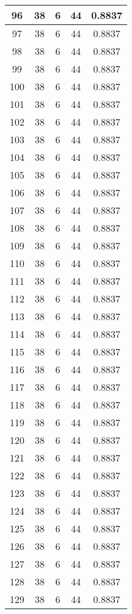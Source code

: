 \documentclass[letterpaper, 12pt]{article}
\begin{document}
\begin{longtable}{|c|c|c|c|c|}
\hline
96 & 38 & 6 & 44 & 0.8837 \\
\hline
97 & 38 & 6 & 44 & 0.8837 \\
\hline
98 & 38 & 6 & 44 & 0.8837 \\
\hline
99 & 38 & 6 & 44 & 0.8837 \\
\hline
100 & 38 & 6 & 44 & 0.8837 \\
\hline
101 & 38 & 6 & 44 & 0.8837 \\
\hline
102 & 38 & 6 & 44 & 0.8837 \\
\hline
103 & 38 & 6 & 44 & 0.8837 \\
\hline
104 & 38 & 6 & 44 & 0.8837 \\
\hline
105 & 38 & 6 & 44 & 0.8837 \\
\hline
106 & 38 & 6 & 44 & 0.8837 \\
\hline
107 & 38 & 6 & 44 & 0.8837 \\
\hline
108 & 38 & 6 & 44 & 0.8837 \\
\hline
109 & 38 & 6 & 44 & 0.8837 \\
\hline
110 & 38 & 6 & 44 & 0.8837 \\
\hline
111 & 38 & 6 & 44 & 0.8837 \\
\hline
112 & 38 & 6 & 44 & 0.8837 \\
\hline
113 & 38 & 6 & 44 & 0.8837 \\
\hline
114 & 38 & 6 & 44 & 0.8837 \\
\hline
115 & 38 & 6 & 44 & 0.8837 \\
\hline
116 & 38 & 6 & 44 & 0.8837 \\
\hline
117 & 38 & 6 & 44 & 0.8837 \\
\hline
118 & 38 & 6 & 44 & 0.8837 \\
\hline
119 & 38 & 6 & 44 & 0.8837 \\
\hline
120 & 38 & 6 & 44 & 0.8837 \\
\hline
121 & 38 & 6 & 44 & 0.8837 \\
\hline
122 & 38 & 6 & 44 & 0.8837 \\
\hline
123 & 38 & 6 & 44 & 0.8837 \\
\hline
124 & 38 & 6 & 44 & 0.8837 \\
\hline
125 & 38 & 6 & 44 & 0.8837 \\
\hline
126 & 38 & 6 & 44 & 0.8837 \\
\hline
127 & 38 & 6 & 44 & 0.8837 \\
\hline
128 & 38 & 6 & 44 & 0.8837 \\
\hline
129 & 38 & 6 & 44 & 0.8837 \\

\end{longtable}
\end{document}
